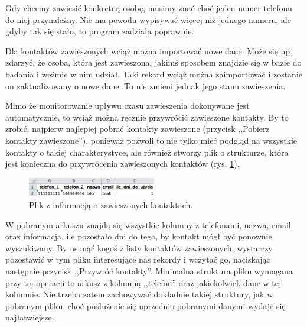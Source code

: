 \documentclass[12pt, twoside, hidelinks]{report}
\begin{document}
Gdy chcemy zawiesić konkretną osobę, musimy znać choć jeden numer telefonu do niej przynależny. Nie ma powodu wypisywać więcej niż jednego numeru, ale gdyby tak się stało, to program zadziała poprawnie. \par
Dla kontaktów zawieszonych wciąż można importować nowe dane. Może się np. zdarzyć, że osoba, która jest zawieszona, jakimś sposobem znajdzie się w bazie do badania i weźmie w nim udział. Taki rekord wciąż można zaimportować i zostanie on zaktualizowany o nowe dane. To nie zmieni jednak jego stanu zawieszenia. \par
Mimo że monitorowanie upływu czasu zawieszenia dokonywane jest automatycznie, to wciąż można ręcznie przywrócić zawieszone kontakty. By to zrobić, najpierw najlepiej pobrać kontakty zawieszone (przycisk ,,Pobierz kontakty zawieszone''), ponieważ pozwoli to nie tylko mieć podgląd na wszystkie kontakty o takiej charakterystyce, ale również stworzy plik o strukturze, która jest konieczna do przywrócenia zawieszonych kontaktów (rys. \ref{zawieszanie_kontaktow_pobrany_plik}). \par
\begin{figure}[h!]
\includegraphics[width = 0.5\textwidth]{2.4.}
\centering
\caption{Plik z informacją o zawieszonych kontaktach.}
\label{zawieszanie_kontaktow_pobrany_plik}
\end{figure}
W pobranym arkuszu znajdą się wszystkie kolumny z telefonami, nazwa, email oraz informacja, ile pozostało dni do tego, by kontakt mógł być ponownie wyszukiwany. By usunąć kogoś z listy kontaktów zawieszonych, wystarczy pozostawić w tym pliku interesujące nas rekordy i wczytać go, naciskając następnie przycisk ,,Przywróć kontakty''. Minimalna struktura pliku wymagana przy tej operacji to arkusz z kolumną ,,telefon'' oraz jakiekolwiek dane w tej kolumnie. Nie trzeba zatem zachowywać dokładnie takiej struktury, jak w pobranym pliku, choć posłużenie się uprzednio pobranymi danymi wydaje się najłatwiejsze.
\end{document}
